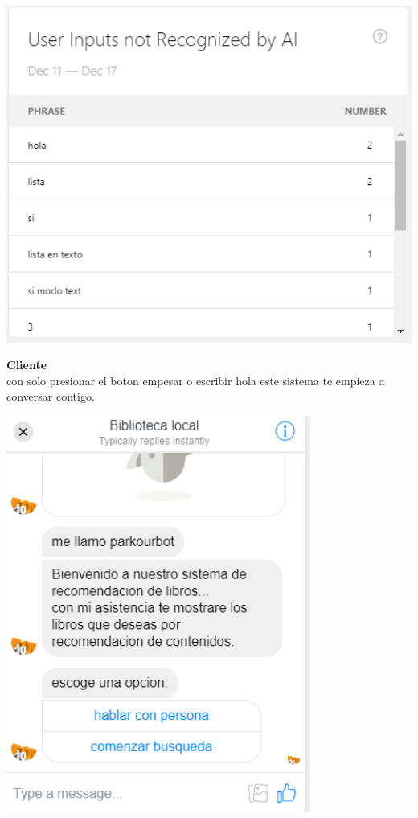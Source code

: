 \begin{enumerate}
    \begin{center}
    \includegraphics[width=15cm]{./Imagenes/grafico2}
    \end{center}
    
    \newpage
    \textbf {Cliente}\\
    con solo presionar el boton empesar o escribir hola este sistema te empieza a conversar contigo.
    \begin{center}
    \includegraphics[width=10cm]{./Imagenes/cliente}
    \end{center}


\end{enumerate}


